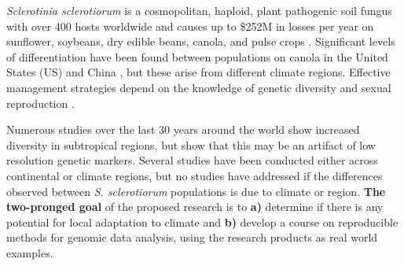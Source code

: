 \documentclass[12pt,letterpaper]{article}
\begin{document}







\textit{Sclerotinia sclerotiorum} is a cosmopolitan, haploid, plant pathogenic soil fungus with over 400 hosts worldwide \citep{bolton2006sclerotinia} and causes up to \$252M in losses per year on sunflower, soybeans, dry edible beans, canola, and pulse crops \citep{uscanola}. 
Significant levels of differentiation have been found between populations on canola in the United States (US) and China \citep{attanayake2013sclerotinia}, but these arise from different climate regions. 
Effective management strategies depend on the knowledge of genetic diversity and sexual reproduction \citep{grunwald2016population}.

Numerous studies over the last 30 years around the world show increased diversity in subtropical regions, but \citet{lehner2017sclerotinia} show that this may be an artifact of low resolution genetic markers.
Several studies have been conducted either across continental or climate regions, but no studies have addressed if the differences observed between \textit{S. sclerotiorum} populations is due to climate or region. 
\textbf{The two-pronged goal} of the proposed research is to \textbf{a)} determine if there is any potential for local adaptation to climate and \textbf{b)} develop a course on reproducible methods for genomic data analysis, using the research products as real world examples. 
\end{document}
